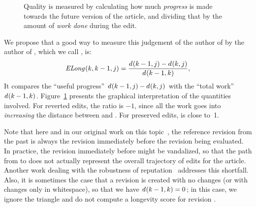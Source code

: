 \begin{figure}
\centering
{}
\caption[Quality is progress towards the future, divided by the work done]{
        Quality is measured by calculating how much \textit{progress}
	is made towards the future version of the article,
	and dividing that by the amount of \textit{work done}
	during the edit.}
\label{fig-editlong}
\end{figure}

We propose that a good way to measure this judgement
of the author of 
by the author of ,
which we call , is:
\begin{equation}
\esurv{}{k,k-1,j} = \frac{\dist{}{k-1,j} - \dist{}{k,j}}
                        {\dist{}{k-1,k}},
\label{eq:esurv}
\end{equation}
It compares the ``useful progress''
$d_{}(k-1,j) - d_{}(k,j)$
with the ``total work''
$d_{}(k-1,k)$.
Figure~\ref{fig-editlong} presents the graphical interpretation
of the quantities involved.
  For reverted edits, the ratio 
  is $-1$, since all the work
  goes into \textit{increasing} the distance between  and .
  For preserved edits,  is close to~1.

Note that here and in our original work on
this topic~\cite{Adler2007}, the reference revision from the past is always
the revision immediately before the revision being evaluated.
In practice, the revision immediately before might be vandalized,
so that the path from  to  does not
actually represent the overall trajectory of edits for the
article.
Another work dealing with
the robustness of reputation~\cite{Chatterjee2008} addresses this
shortfall.
Also, it is sometimes the case that a revision is created with
no changes (or with changes only in whitespace), so that we
have $d_{}(k-1,k) = 0$; in this case, we ignore the triangle
and do not compute a longevity score for revision .

